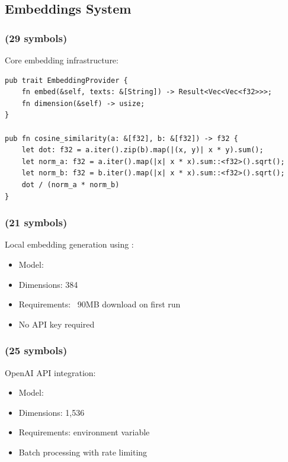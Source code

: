 \subsection{Embeddings System}

\subsubsection{ (29 symbols)}

Core embedding infrastructure:

\begin{lstlisting}[style=rustcode, caption={Embedding provider trait}]
pub trait EmbeddingProvider {
    fn embed(&self, texts: &[String]) -> Result<Vec<Vec<f32>>>;
    fn dimension(&self) -> usize;
}

pub fn cosine_similarity(a: &[f32], b: &[f32]) -> f32 {
    let dot: f32 = a.iter().zip(b).map(|(x, y)| x * y).sum();
    let norm_a: f32 = a.iter().map(|x| x * x).sum::<f32>().sqrt();
    let norm_b: f32 = b.iter().map(|x| x * x).sum::<f32>().sqrt();
    dot / (norm_a * norm_b)
}
\end{lstlisting}

\subsubsection{ (21 symbols)}

Local embedding generation using :

\begin{itemize}
    \item Model: 
    \item Dimensions: 384
    \item Requirements: ~90MB download on first run
    \item No API key required
\end{itemize}

\subsubsection{ (25 symbols)}

OpenAI API integration:

\begin{itemize}
    \item Model: 
    \item Dimensions: 1,536
    \item Requirements:  environment variable
    \item Batch processing with rate limiting
\end{itemize}
